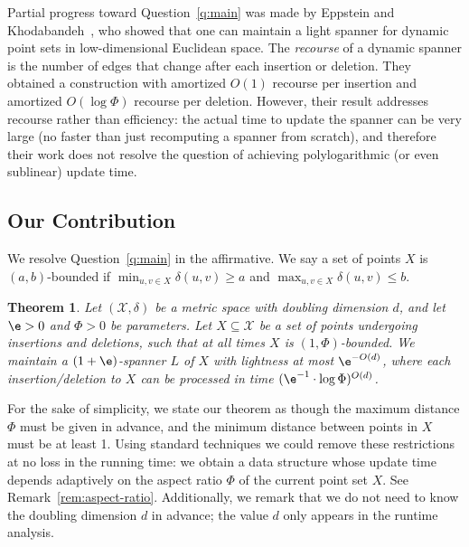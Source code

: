 \documentclass[11pt]{article}
\newtheorem{theorem}{Theorem}[section]
\newcommand{\cX}{\mathcal{X}}
\newcommand{\dist}{\ensuremath{\delta}}
\newcommand{\ddim}{\ensuremath{d}}
\begin{document}
Partial progress toward Question~\ref{q:main} was made by Eppstein and Khodabandeh~\cite{EK24}, who showed that one can maintain a  light spanner for dynamic point sets in low-dimensional Euclidean space. The \emph{recourse} of a dynamic spanner is the number of edges that change after each insertion or deletion. They obtained a construction with amortized $O(1)$ recourse per insertion and amortized $O(\log \Phi)$ recourse per deletion. However, their result addresses recourse rather than efficiency: the actual time to update the spanner can be very large (no faster than just recomputing a spanner from scratch), and therefore their work does not resolve the question of achieving polylogarithmic (or even sublinear) update time.





\subsection{Our Contribution}

We resolve Question~\ref{q:main} in the affirmative. We say a set of points $X$ is $(a,b)$-bounded if $\min_{u,v \in X} \dist(u,v) \ge a$ and $\max_{u,v \in X} \dist(u,v) \le b$.
\begin{theorem}
\label{thm:main}
    Let $(\cX, \dist)$ be a metric space with doubling dimension $\ddim$, and let $\e >0$ and $\Phi > 0$ be parameters. Let $X \subseteq \cX$ be a set of points undergoing insertions and deletions, such that at all times $X$ is $(1, \Phi)$-bounded. We maintain a $(1+\e)$-spanner $L$ of $X$ with lightness at most $\e^{-O(\ddim)}$, where each insertion/deletion to $X$ can be processed in time $(\e^{-1} \cdot \log \Phi)^{O(\ddim)}$.
\end{theorem}
For the sake of simplicity, we state our theorem as though the maximum distance $\Phi$ must be given in advance, and the minimum distance between points in $X$ must be at least 1. Using standard techniques \cite{KL04,EK24} we could remove these restrictions at no loss in the running time: we obtain a data structure whose update time depends adaptively on the aspect ratio $\Phi$ of the current point set $X$. See Remark~\ref{rem:aspect-ratio}. 
Additionally, we remark that we do not need to know the doubling dimension $\ddim$ in advance; the value $\ddim$ only appears in the runtime analysis.
\end{document}
